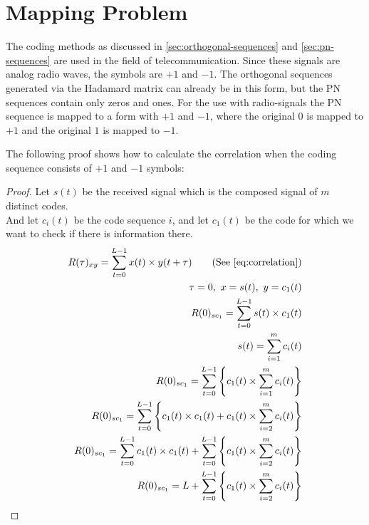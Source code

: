 
\section{Mapping Problem}
\label{sec:mapping-problem}

The coding methods as discussed in \autoref{sec:orthogonal-sequences} and \autoref{sec:pn-sequences} are used in the field of telecommunication.
Since these signals are analog radio waves, the symbols are $+1$ and $-1$.
The orthogonal sequences generated via the Hadamard matrix can already be in this form, but the PN sequences contain only zeros and ones.
For the use with radio-signals the PN sequence is mapped to a form with $+1$ and $-1$, where the original $0$ is mapped to $+1$ and the original $1$ is mapped to $-1$.




The following proof  shows how to calculate the correlation when the coding sequence consists of $+1$ and $-1$ symbols: 

\begin{proof}
	Let $s(t)$ be the received signal which is the composed signal of $m$ distinct codes.\\
	And let $c_i(t)$ be the code sequence $i$, and let $c_1(t)$ be the code for which we want to check if there is information there. \\

	\begin{align*}
		R(\tau)_{xy} = \displaystyle\sum_{t = 0} ^ {L - 1} x(t) \times y(t + \tau)	\tag{See \autoref{eq:correlation}}
		\\ \tau = 0,\ x = s(t),\ y = c_1(t)	
		\\ R(0)_{sc_{1}} = \displaystyle\sum_{t = 0} ^ {L - 1} s(t) \times c_1(t)
		\\ s(t) = \displaystyle\sum_{i = 1} ^ {m} c_i(t)														
		\\ R(0)_{sc_{1}} = \displaystyle\sum_{t = 0} ^ {L - 1}  \Bigg\{  c_1(t)	\times \displaystyle\sum_{i = 1} ^ {m} c_i(t) \Bigg\}
		\\ R(0)_{sc_{1}} = \displaystyle\sum_{t = 0} ^ {L - 1} \Bigg\{ c_1(t) \times c_1(t) + c_1(t) \times  \displaystyle\sum_{i = 2} ^ {m} c_i(t) \Bigg\} 
		\\ R(0)_{sc_{1}} = \displaystyle\sum_{t = 0} ^ {L - 1} c_1(t) \times c_1(t) + \displaystyle\sum_{t = 0} ^ {L - 1} \Bigg\{ c_1(t) \times  \displaystyle\sum_{i = 2} ^ {m} c_i(t) \Bigg\} 
		\\ R(0)_{sc_{1}} = L + \displaystyle\sum_{t = 0} ^ {L - 1} \Bigg\{ c_1(t) \times  \displaystyle\sum_{i = 2} ^ {m} c_i(t) \Bigg\} 
	\end{align*}

\end{proof}

